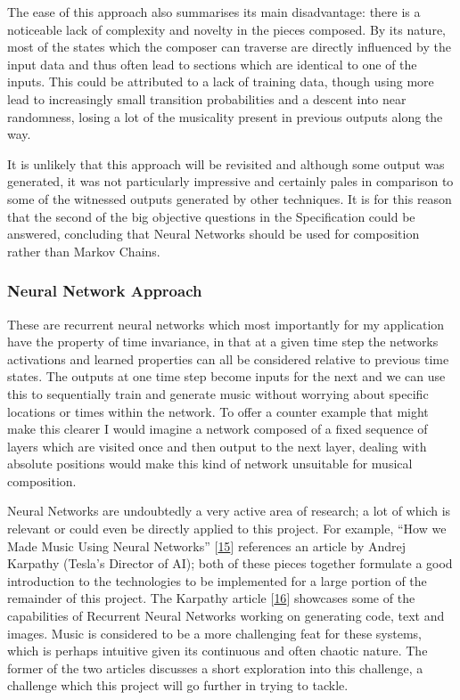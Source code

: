 \documentclass[12pt,]{article}
\begin{document}
The ease of this approach also summarises its main disadvantage: there
is a noticeable lack of complexity and novelty in the pieces composed.
By its nature, most of the states which the composer can traverse are
directly influenced by the input data and thus often lead to sections
which are identical to one of the inputs. This could be attributed to a
lack of training data, though using more lead to increasingly small
transition probabilities and a descent into near randomness, losing a
lot of the musicality present in previous outputs along the way.

It is unlikely that this approach will be revisited and although some
output was generated, it was not particularly impressive and certainly
pales in comparison to some of the witnessed outputs generated by other
techniques. It is for this reason that the second of the big objective
questions in the Specification could be answered, concluding that Neural
Networks should be used for composition rather than Markov Chains.

\hypertarget{neural-network-approach}{%
\subsubsection{Neural Network Approach}\label{neural-network-approach}}

These are recurrent neural networks which most importantly for my
application have the property of time invariance, in that at a given
time step the networks activations and learned properties can all be
considered relative to previous time states. The outputs at one time
step become inputs for the next and we can use this to sequentially
train and generate music without worrying about specific locations or
times within the network. To offer a counter example that might make
this clearer I would imagine a network composed of a fixed sequence of
layers which are visited once and then output to the next layer, dealing
with absolute positions would make this kind of network unsuitable for
musical composition.

Neural Networks are undoubtedly a very active area of research; a lot of
which is relevant or could even be directly applied to this project. For
example, ``How we Made Music Using Neural Networks''
{[}\protect\hyperlink{ref-alextavgen}{15}{]} references an article by
Andrej Karpathy (Tesla's Director of AI); both of these pieces together
formulate a good introduction to the technologies to be implemented for
a large portion of the remainder of this project. The Karpathy article
{[}\protect\hyperlink{ref-karpathy}{16}{]} showcases some of the
capabilities of Recurrent Neural Networks working on generating code,
text and images. Music is considered to be a more challenging feat for
these systems, which is perhaps intuitive given its continuous and often
chaotic nature. The former of the two articles discusses a short
exploration into this challenge, a challenge which this project will go
further in trying to tackle.
\end{document}
